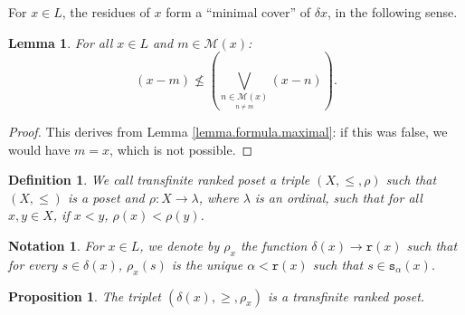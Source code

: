 \documentclass{article}
\newcommand{\comm}[2]{\begin{tcolorbox}[colback=gray!40]\textbf{Comment} (#1) : #2\end{tcolorbox}}
\newcommand{\blue}{\color{blue}}
\newtheorem{lemma}[theorem]{Lemma}
\newtheorem{definition}[theorem]{Definition}
\newtheorem{notation}[theorem]{Notation}
\newtheorem{proposition}[theorem]{Proposition}
\begin{document}

For  $x \in L$, the residues of $x$ form a ``minimal cover'' of $\delta x$, in the following sense.

\begin{lemma}\label{lemma.noncomparable}
    For all $x \in L$ and $m \in \mathcal{M}(x)$: \[(x-m) \not \le \left(\bigvee_{\underset{n \neq m}{n \in \mathcal{M}(x)}} (x-n) \right).\]
\end{lemma}

\begin{proof}
    This derives from Lemma \ref{lemma.formula.maximal}: if this was false, we would have $m = x$, which is not possible.
\end{proof}





\begin{definition}
    We call transfinite ranked poset a triple $(X,\le,\rho)$ 
    such that $(X,\le)$ is a poset and $\rho : X \rightarrow \lambda$, where $\lambda$ is an ordinal, such that for all $x,y \in X$, if $x < y$, $\rho(x) < \rho(y)$.
\end{definition}

\begin{notation}
    For $x \in L$, we denote by $\rho_x$ the function $\delta(x) \rightarrow \texttt{r}(x)$ such that 
    for every $s \in \delta(x)$, $\rho_x(s)$ is the unique $\alpha < \texttt{r}(x)$ such that $s \in \texttt{s}_{\alpha}(x)$.
\end{notation}

\begin{proposition}
    The triplet $(\delta(x),\ge,\rho_x)$ is a transfinite ranked poset.
\end{proposition}
\end{document}
